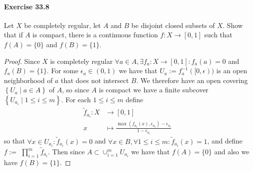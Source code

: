 \documentclass{article}
\begin{document}
\paragraph{Exercise 33.8} Let $X$ be completely regular, let $A$ and $B$ be disjoint closed subsets of $X$. Show that if $A$ is compact, there is a continuous function $f \colon X \rightarrow [0, 1]$ such that $f(A) = \{0\}$ and $f(B) = \{1\}$.
\begin{proof}
    Since $X$ is completely regular $\forall a \in A, \exists f_a: X \rightarrow[0,1]: f_a(a)=0$ and $f_a(B)=\{1\}$. For some $\epsilon_a \in(0,1)$ we have that $U_a:=f_a^{-1}([0, \epsilon))$ is an open neighborhood of $a$ that does not intersect $B$. We therefore have an open covering $\left\{U_a \mid a \in A\right\}$ of $A$, so since $A$ is compact we have a finite subcover $\left\{U_{a_i} \mid 1 \leq i \leq m\right\}$. For each $1 \leq i \leq m$ define
$$
\begin{aligned}
\tilde{f}_{a_i}: X & \rightarrow[0,1] \\
x & \mapsto \frac{\max \left(f_{a_i}(x), \epsilon_{a_i}\right)-\epsilon_{a_i}}{1-\epsilon_{a_i}}
\end{aligned}
$$
so that $\forall x \in U_{a_i}: \tilde{f}_{a_i}(x)=0$ and $\forall x \in B, \forall 1 \leq i \leq m: \tilde{f}_{a_i}(x)=1$, and define $f:=$ $\prod_{i=1}^m \tilde{f}_{a_i}$. Then since $A \subset \cup_{i=1}^m U_{a_i}$ we have that $f(A)=\{0\}$ and also we have $f(B)=\{1\}$.
\end{proof}
\end{document}

